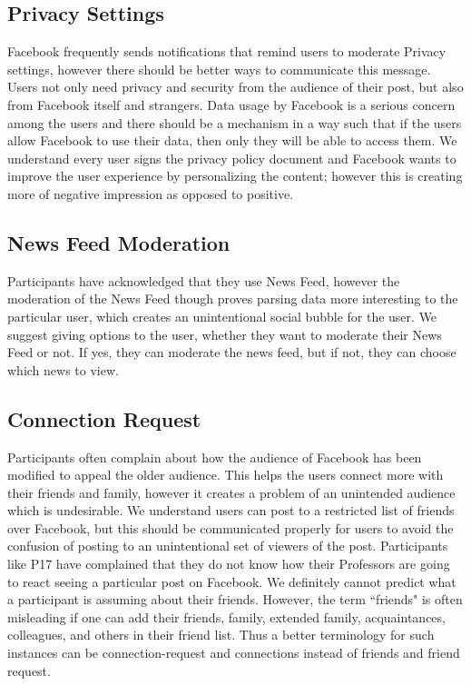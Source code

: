 \subsection{Privacy Settings}
Facebook frequently sends notifications that remind users to moderate Privacy settings, however there should be better ways to communicate this message. Users not only need privacy and security from the audience of their post, but also from Facebook itself and strangers. Data usage by Facebook is a serious concern among the users and there should be a mechanism in a way such that if the users allow Facebook to use their data, then only they will be able to access them. We understand every user signs the privacy policy document and Facebook wants to improve the user experience by personalizing the content; however this is creating more of negative impression as opposed to positive.
\subsection{News Feed Moderation}
Participants have acknowledged that they use News Feed, however the moderation of the News Feed though proves parsing data more interesting to the particular user, which creates an unintentional social bubble for the user. We suggest giving options to the user, whether they want to moderate their News Feed or not. If yes, they can moderate the news feed, but if not, they can choose which news to view.
\subsection{Connection Request}
Participants often complain about how the audience of Facebook has been modified to appeal the older audience. This helps the users connect more with their friends and family, however it creates a problem of an unintended audience which is undesirable. We understand users can post to a restricted list of friends over Facebook, but this should be communicated properly for users to avoid the confusion of posting to an unintentional set of viewers of the post. Participants like P17 have complained that they do not know how their Professors are going to react seeing a particular post on Facebook. We definitely cannot predict what a participant is assuming about their friends. However, the term ``friends" is often misleading if one can add their friends, family, extended family, acquaintances, colleagues, and others in their friend list. Thus a better terminology for such instances can be connection-request and connections instead of friends and friend request.
